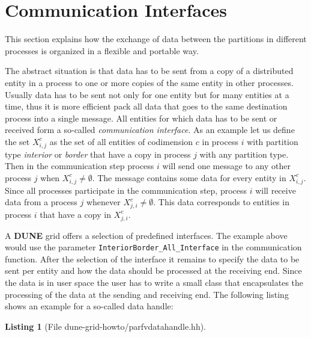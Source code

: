 \documentclass[11pt,a4paper,headinclude,footinclude,DIV16,normalheadings]{scrreprt}
\newcommand{\Dune}{{\sf\bfseries DUNE}\xspace}
\newtheorem{lst}{Listing}
\begin{document}
\section{Communication Interfaces}

This section explains how the exchange of data between the partitions
in different processes is organized in a flexible and portable way.

The abstract situation is that data has to be sent from a copy of a
distributed entity in a process to one or more copies of the same
entity in other processes. Usually data has to be sent not only for
one entity but for many entities at a time, thus it is more efficient
pack all data that goes to the same destination process into a single
message. All entities for which data has to be sent or received form a
so-called \textit{communication interface}. As an example let us define the set
$X_{i,j}^c$ as the set of all entities of codimension $c$ in process $i$
  with partition type \textit{interior} or \textit{border} that have
a copy in process $j$ with any partition type. Then in the
communication step process $i$ will send one message to any other
process $j$ when $X_{i,j}^c\neq\emptyset$. The message contains some data for
every entity in  $X_{i,j}^c$. Since all processes participate in the
communication step, process $i$ will receive data from a process $j$
whenever $X_{j,i}^c\neq\emptyset$. This data corresponds to entities
in process $i$ that have a copy in $X_{j,i}^c$.

A \Dune{} grid offers a selection of predefined interfaces. The example
above would use the parameter \lstinline!InteriorBorder_All_Interface!
in the communication function. After the
selection of the interface it remains to specify the data to be sent
per entity and how the data should be processed at the receiving
end. Since the data is in user space the user has to write a small
class that encapsulates the processing of the data at the sending and
receiving end. The following listing shows an example for a so-called
data handle:


\begin{lst}[File dune-grid-howto/parfvdatahandle.hh] \mbox{}
\nopagebreak

\end{lst}
\end{document}
